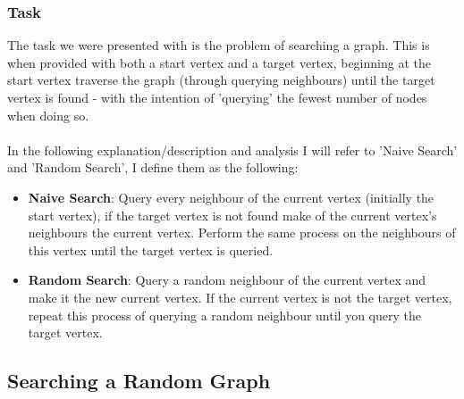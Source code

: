 \documentclass[12pt, a4paper]{article}
\begin{document}
\subsubsection*{Task}
The task we were presented with is the problem of searching a graph. This is when provided with both a start vertex and a target vertex, beginning at the start vertex traverse the graph (through querying neighbours) until the target vertex is found - with the intention of 'querying' the fewest number of nodes when doing so.\\
\\
In the following explanation/description and analysis I will refer to 'Naive Search' and 'Random Search', I define them as the following:
\begin{itemize}
\renewcommand\labelitemi{\tiny$\bullet$}
\item \textbf{Naive Search}: Query every neighbour of the current vertex (initially the start vertex), if the target vertex is not found make of the current vertex's neighbours the current vertex. Perform the same process on the neighbours of this vertex until the target vertex is queried. 
\item \textbf{Random Search}: Query a random neighbour of the current vertex and make it the new current vertex. If the current vertex is not the target vertex, repeat this process of querying a random neighbour until you query the target vertex.
\end{itemize}

\subsection*{Searching a Random Graph }
\end{document}
